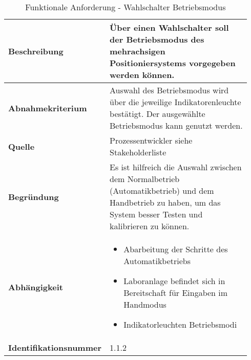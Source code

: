\documentclass[../Bachelorarbeit.tex]{subfiles}
\begin{document}
\begin{table}[H]
    \centering
    \begin{tabular}{| p{0.34\linewidth} | p{0.6\linewidth} |}
        \hline
        \textbf{Beschreibung} & Über einen Wahlschalter soll der Betriebsmodus des mehrachsigen Positioniersystems vorgegeben werden können. \\ \hline
        \textbf{Abnahmekriterium} & Auswahl des Betriebsmodus wird über die jeweilige Indikatorenleuchte bestätigt. Der ausgewählte Betriebsmodus kann genutzt werden. \\ \hline
        \textbf{Quelle} & Prozessentwickler siehe Stakeholderliste \\ \hline
        \textbf{Begründung} & Es ist hilfreich die Auswahl zwischen dem Normalbetrieb (Automatikbetrieb) und dem Handbetrieb zu haben, um das System besser Testen und kalibrieren zu können. \\ \hline
        \textbf{Abhängigkeit} & {\begin{itemize}[noitemsep,topsep=0pt,parsep=0pt,partopsep=0pt,leftmargin=*]
            \item Abarbeitung der Schritte des Automatikbetriebs
            \item Laboranlage befindet sich in Bereitschaft für Eingaben im Handmodus
            \item Indikatorleuchten Betriebsmodi
        \end{itemize}} \\ \hline
        \textbf{Identifikationsnummer} & 1.1.2 \\ \hline
    \end{tabular}
    \caption[\acs{fa} - Wahlschalter Betriebsmodus]{Funktionale Anforderung - Wahlschalter Betriebsmodus}
    \label{tab:my-table2}
\end{table}
\end{document}
